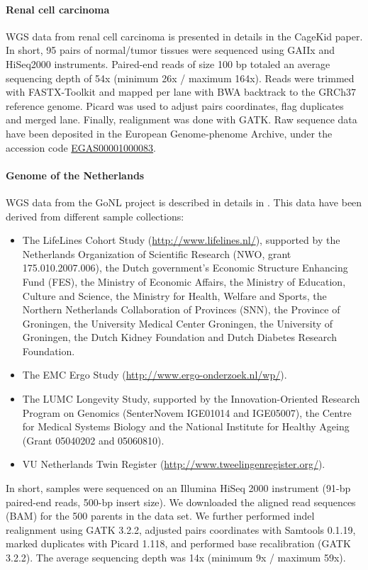 \paragraph{Renal cell carcinoma}
WGS data from renal cell carcinoma is presented in details in the CageKid paper\cite{Scelo2014}.
In short, 95 pairs of normal/tumor tissues were sequenced using GAIIx and HiSeq2000 instruments.
Paired-end reads of size 100 bp totaled an average sequencing depth of 54x (minimum 26x / maximum 164x).
Reads were trimmed with {\sf FASTX-Toolkit} and mapped per lane with {\sf BWA} backtrack to the GRCh37 reference genome.
{\sf Picard} was used to adjust pairs coordinates, flag duplicates and merged lane.
Finally, realignment was done with {\sf GATK}.
Raw sequence data have been deposited in the European Genome-phenome Archive, under the accession code \href{https://www.ebi.ac.uk/ega/studies/EGAS00001000083}{EGAS00001000083}.

\paragraph{Genome of the Netherlands}
WGS data from the GoNL project is described in details in \citet{Francioli2014}. This data have been derived from different sample collections:
\begin{itemize}
\item The LifeLines Cohort Study (\url{http://www.lifelines.nl/}), supported by the Netherlands Organization of Scientific Research (NWO, grant 175.010.2007.006), the Dutch government's Economic Structure Enhancing Fund (FES), the Ministry of Economic Affairs, the Ministry of Education, Culture and Science, the Ministry for Health, Welfare and Sports, the Northern Netherlands Collaboration of Provinces (SNN), the Province of Groningen, the University Medical Center Groningen, the University of Groningen, the Dutch Kidney Foundation and Dutch Diabetes Research Foundation.
\item The EMC Ergo Study (\url{http://www.ergo-onderzoek.nl/wp/}).
\item The LUMC Longevity Study, supported by the Innovation-Oriented Research Program on Genomics (SenterNovem IGE01014 and IGE05007), the Centre for Medical Systems Biology and the National Institute for Healthy Ageing (Grant 05040202 and 05060810).
\item VU Netherlands Twin Register (\url{http://www.tweelingenregister.org/}).
\end{itemize}

In short, samples were sequenced on an Illumina HiSeq 2000 instrument (91-bp paired-end reads, 500-bp insert size).
We downloaded the aligned read sequences (BAM) for the 500 parents in the data set.
We further performed indel realignment using {\sf GATK} 3.2.2, adjusted pairs coordinates with {\sf Samtools} 0.1.19, marked duplicates with {\sf Picard} 1.118, and performed base recalibration ({\sf GATK} 3.2.2).
The average sequencing depth was 14x (minimum 9x / maximum 59x).

